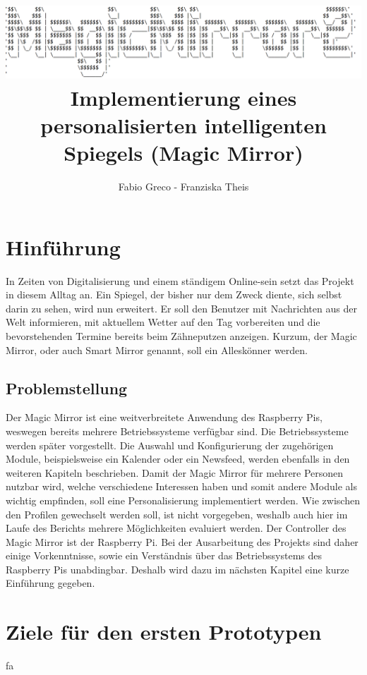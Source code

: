 \documentclass[12pt,a4paper]{report}
\author{Fabio Greco - Franziska Theis}
\title{\includegraphics[scale=1]{Cover.png} \\
Implementierung eines personalisierten intelligenten Spiegels (Magic Mirror) 
}
\begin{document}
\maketitle

\chapter{Hinführung}
In Zeiten von Digitalisierung und einem ständigem Online-sein setzt das Projekt in diesem Alltag an. Ein Spiegel, der bisher nur dem Zweck diente, sich selbst darin zu sehen, wird nun erweitert. Er soll den Benutzer mit Nachrichten aus der Welt informieren, mit aktuellem Wetter auf den Tag vorbereiten und die bevorstehenden Termine bereits beim Zähneputzen anzeigen. Kurzum, der Magic Mirror, oder auch Smart Mirror genannt, soll ein Alleskönner werden. 
\section{Problemstellung}
Der Magic Mirror ist eine weitverbreitete Anwendung des Raspberry Pis, weswegen bereits mehrere Betriebssysteme verfügbar sind. Die Betriebssysteme werden später vorgestellt. 
Die Auswahl und Konfigurierung der zugehörigen Module, beispielsweise ein Kalender oder ein Newsfeed, werden ebenfalls in den weiteren Kapiteln beschrieben. 
Damit der Magic Mirror für mehrere Personen nutzbar wird, welche verschiedene Interessen haben und somit andere Module als wichtig empfinden, soll eine Personalisierung implementiert werden. Wie zwischen den Profilen gewechselt werden soll, ist nicht vorgegeben, weshalb auch hier im Laufe des Berichts mehrere Möglichkeiten evaluiert werden. 
Der Controller des Magic Mirror ist der Raspberry Pi. Bei der Ausarbeitung des Projekts sind daher einige Vorkenntnisse, sowie ein Verständnis über das Betriebssystems des Raspberry Pis unabdingbar. Deshalb wird dazu im nächsten Kapitel eine kurze Einführung gegeben.



\chapter{Ziele für den ersten Prototypen}

fa

 
\end{document}
